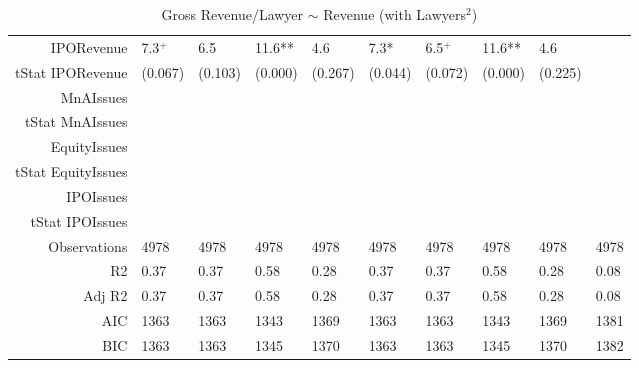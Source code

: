 \begin{table}[ht]
\begin{tabular}{rlllllllll}
  IPORevenue & 7.3$^{+}$ & 6.5 & 11.6** & 4.6 & 7.3* & 6.5$^{+}$ & 11.6** & 4.6 &  \\ 
  tStat IPORevenue & (0.067) & (0.103) & (0.000) & (0.267) & (0.044) & (0.072) & (0.000) & (0.225) &  \\ 
  MnAIssues &  &  &  &  &  &  &  &  &  \\ 
  tStat MnAIssues &  &  &  &  &  &  &  &  &  \\ 
  EquityIssues &  &  &  &  &  &  &  &  &  \\ 
  tStat EquityIssues &  &  &  &  &  &  &  &  &  \\ 
  IPOIssues &  &  &  &  &  &  &  &  &  \\ 
  tStat IPOIssues &  &  &  &  &  &  &  &  &  \\ 
  Observations & 4978 & 4978 & 4978 & 4978 & 4978 & 4978 & 4978 & 4978 & 4978 \\ 
  R2 & 0.37 & 0.37 & 0.58 & 0.28 & 0.37 & 0.37 & 0.58 & 0.28 & 0.08 \\ 
  Adj R2 & 0.37 & 0.37 & 0.58 & 0.28 & 0.37 & 0.37 & 0.58 & 0.28 & 0.08 \\ 
  AIC & 1363 & 1363 & 1343 & 1369 & 1363 & 1363 & 1343 & 1369 & 1381 \\ 
  BIC & 1363 & 1363 & 1345 & 1370 & 1363 & 1363 & 1345 & 1370 & 1382 \\ 
   \hline
\end{tabular}
\caption{Gross Revenue/Lawyer $\sim$ Revenue (with Lawyers$^2$)} 
\end{table}
